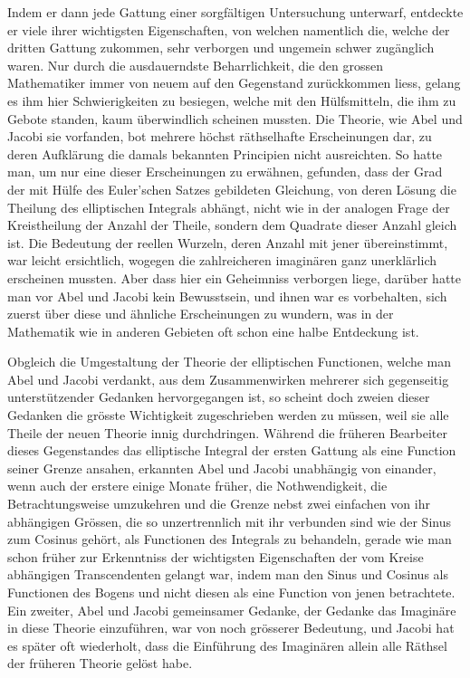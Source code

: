 \documentclass[11pt]{article}
\begin{document}
Indem er dann jede Gattung einer sorgfältigen Untersuchung unterwarf, entdeckte er viele ihrer wichtigsten Eigenschaften, von welchen namentlich die, welche der dritten Gattung zukommen, sehr verborgen und ungemein schwer zugänglich waren. Nur durch die ausdauerndste Beharrlichkeit, die den grossen Mathematiker immer von neuem auf den Gegenstand zurückkommen liess, gelang es ihm hier Schwierigkeiten zu besiegen, welche mit den Hülfsmitteln, die ihm zu Gebote standen, kaum überwindlich scheinen mussten. Die Theorie, wie Abel und Jacobi sie vorfanden, bot mehrere höchst räthselhafte Erscheinungen dar, zu deren Aufklärung die damals bekannten Principien nicht ausreichten. So hatte man, um nur eine dieser Erscheinungen zu erwähnen, gefunden, dass der Grad der mit Hülfe des Euler’schen Satzes gebildeten Gleichung, von deren Lösung die Theilung des elliptischen Integrals abhängt, nicht wie in der analogen Frage der Kreistheilung der Anzahl der Theile, sondern dem Quadrate dieser Anzahl gleich ist. Die Bedeutung der reellen Wurzeln, deren Anzahl mit jener übereinstimmt, war leicht ersichtlich, wogegen die zahlreicheren imaginären ganz unerklärlich erscheinen mussten. Aber dass hier ein Geheimniss verborgen liege, darüber hatte man vor Abel und Jacobi kein Bewusstsein, und ihnen war es vorbehalten, sich zuerst über diese und ähnliche Erscheinungen zu wundern, was in der Mathematik wie in anderen Gebieten oft schon eine halbe Entdeckung ist.

Obgleich die Umgestaltung der Theorie der elliptischen Functionen, welche man Abel und Jacobi verdankt, aus dem Zusammenwirken mehrerer sich gegenseitig unterstützender Gedanken hervorgegangen ist, so scheint doch zweien dieser Gedanken die grösste Wichtigkeit zugeschrieben werden zu müssen, weil sie alle Theile der neuen Theorie innig durchdringen. Während die früheren Bearbeiter dieses Gegenstandes das elliptische Integral der ersten Gattung als eine Function seiner Grenze ansahen, erkannten Abel und Jacobi unabhängig von einander, wenn auch der erstere einige Monate früher, die Nothwendigkeit, die Betrachtungsweise umzukehren und die Grenze nebst zwei einfachen von ihr abhängigen Grössen, die so unzertrennlich mit ihr verbunden sind wie der Sinus zum Cosinus gehört, als Functionen des Integrals zu behandeln, gerade wie man schon früher zur Erkenntniss der wichtigsten Eigenschaften der vom Kreise abhängigen Transcendenten gelangt war, indem man den Sinus und Cosinus als Functionen des Bogens und nicht diesen als eine Function von jenen betrachtete. Ein zweiter, Abel und Jacobi gemeinsamer Gedanke, der Gedanke das Imaginäre in diese Theorie einzuführen, war von noch grösserer Bedeutung, und Jacobi hat es später oft wiederholt, dass die Einführung des Imaginären allein alle Räthsel der früheren Theorie gelöst habe.
\end{document}
